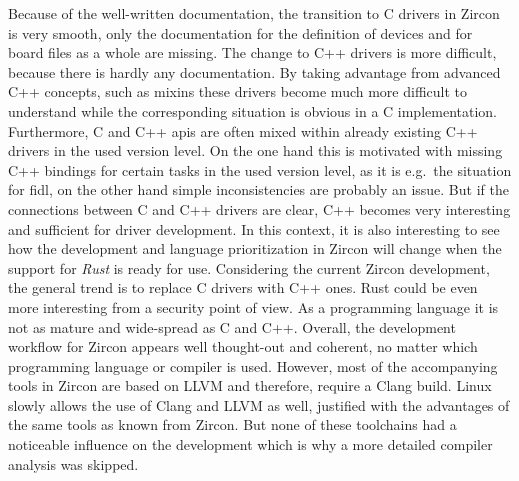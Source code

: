 Because of the well-written documentation, the transition to C drivers in Zircon is very smooth, only the documentation for the definition of devices and for board files as a whole are missing.
The change to C++ drivers is more difficult, because there is hardly any documentation.
By taking advantage from advanced C++ concepts, such as mixins these drivers become much more difficult to understand while the corresponding situation is obvious in a C implementation.
Furthermore, C and C++ \acp{api} are often mixed within already existing C++ drivers in the used version level.
On the one hand this is motivated with missing C++ bindings for certain tasks in the used version level, as it is e.g.\ the situation for \ac{fidl}, on the other hand simple inconsistencies are probably an issue.
But if the connections between C and C++ drivers are clear, C++ becomes very interesting and sufficient for driver development.
In this context, it is also interesting to see how the development and language prioritization in Zircon will change when the support for \textit{Rust} is ready for use.
Considering the current Zircon development, the general trend is to replace C drivers with C++ ones.
Rust could be even more interesting from a security point of view.
As a programming language it is not as mature and wide-spread as C and C++.
Overall, the development workflow for Zircon appears well thought-out and coherent, no matter which programming language or compiler is used.
However, most of the accompanying tools in Zircon are based on LLVM and therefore, require a Clang build.
Linux slowly allows the use of Clang and LLVM as well, justified with the advantages of the same tools as known from Zircon.
But none of these toolchains had a noticeable influence on the development which is why a more detailed compiler analysis was skipped.

